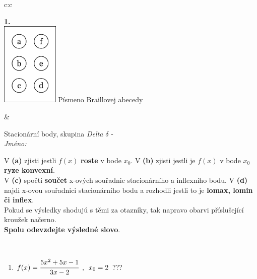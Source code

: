\documentclass[10pt]{report}
\begin{document}
\begin{tabular}{c:c}
\begin{minipage}[c][104.5mm][t]{0.5\linewidth}
\begin{center}
\begin{minipage}{0.79\linewidth}
\end{minipage}
\begin{minipage}{0.20\linewidth}
\begin{center}
{\Huge\bfseries 1.} \\[2mm]
\includegraphics[height=40mm]{../images/braille.png}
{\small Písmeno Braillovej abecedy}
\end{center}
\end{minipage}
\end{center}
\end{minipage}
&
\begin{minipage}[c][104.5mm][t]{0.5\linewidth}
\begin{center}
\vspace{7mm}
{\huge Stacionární body, skupina \textit{Delta $\delta$} -}\\[5mm]
\textit{Jméno:}\phantom{xxxxxxxxxxxxxxxxxxxxxxxxxxxxxxxxxxxxxxxxxxxxxxxxxxxxxxxxxxxxxxxxx}\\[5mm]
\begin{minipage}{0.95\linewidth}
\begin{center}
{\small V \textbf{(a)} zjisti jestli $f(x)$ \textbf{roste} v bode $x_0$. V \textbf{(b)} zjisti jestli je $f(x)$ v bode $x_0$ \textbf{ryze konvexní}.\\V \textbf{(c)} spočti \textbf{součet} x-ových souřadnic stacionárního a inflexního bodu. V \textbf{(d)} najdi x-ovou souřadnici stacionárního bodu a rozhodli jestli to je \textbf{lomax, lomin či inflex}.\\Pokud se výsledky shodujú s těmi za otazníky, tak napravo obarvi příslušející kroužek načerno.\\\textbf{Spolu odevzdejte výsledné slovo}}.
\end{center}
\end{minipage}
\\[1mm]
\begin{minipage}{0.79\linewidth}
\begin{center}
\begin{varwidth}{\linewidth}
\begin{enumerate}
\normalsize
\item $f(x)=\cfrac{5x^2+5x-1}{3x-2}\enspace , \enspace x_0=2$\quad \dotfill\; ???\;\dotfill \quad {}

\end{enumerate}
\end{varwidth}
\end{center}
\end{minipage}
\end{center}
\end{minipage}
\end{tabular}
\end{document}
